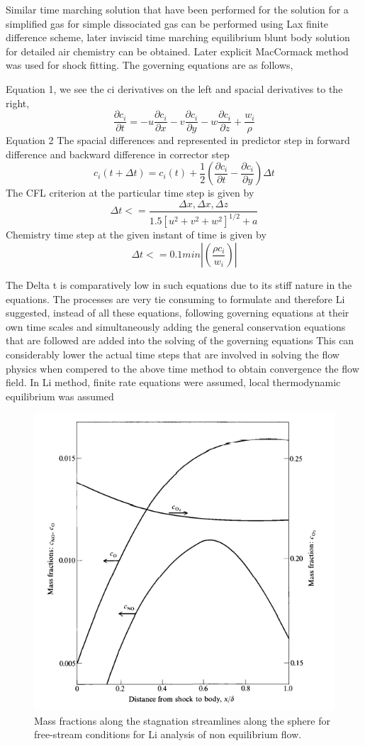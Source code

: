 Similar time marching solution that have been performed for the solution for a simplified gas for simple dissociated gas can be performed using Lax finite difference scheme, later inviscid time marching equilibrium blunt body solution for detailed air chemistry can be obtained. Later explicit MacCormack method was used for shock fitting. The governing equations are as follows,

Equation 1, we see the ci derivatives on the left and spacial derivatives to the right,
\large\[\frac{\partial c_i}{\partial t} = - u \frac{\partial c_i}{\partial x}- v \frac{\partial c_i}{\partial y}- w \frac{\partial c_i}{\partial z} + \frac{ w_i}{\rho}\]
Equation 2 The spacial differences and represented in predictor step in forward difference and backward difference in corrector step
\large\[c_i(t+\Delta t) = c_i(t) + \frac{1}{2}(\frac{\partial c_i}{\partial t}-  \frac{\partial c_i}{\partial y})\Delta t\]
The CFL criterion at the particular time step is given by
\large\[\Delta t {<=}\frac{\Delta x,\Delta x,\Delta z}{1.5[u^2+v^2+w^2]^{1/2}+a}\]
Chemistry time step at the given instant of time is given by
\large \[\Delta t <= 0.1 min|(\frac{\rho c_i}{w_i})|\]

The Delta t is comparatively low in such equations due to its stiff nature in the equations. The processes are very tie consuming to formulate and therefore Li suggested, instead of all these equations, following governing equations at their own time scales and simultaneously adding the general conservation equations that are followed are added into the solving of the governing equations This can considerably lower the actual time steps that are involved in solving the flow physics when compered to the above time method to obtain convergence the flow field. 
In Li method, finite rate equations were assumed, local thermodynamic equilibrium was assumed 
\begin{figure}[ht]
\centering
  \includegraphics[width=0.5\linewidth]{images/stagnation properties along streamline.png}
  \caption{Mass fractions along the stagnation streamlines along the sphere for free-stream conditions for Li analysis of non equilibrium flow.}
  \label{fig:boat1}
\end{figure}


